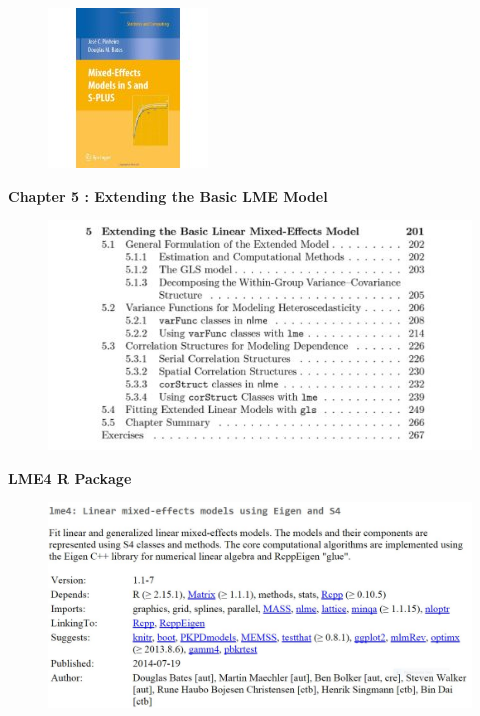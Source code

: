 \documentclass[compress]{beamer}        %
\begin{document}
				\begin{frame}
					\begin{figure}
						\centering
						\includegraphics[width=0.55\linewidth]{images/PinheiroBates}
						
					\end{figure}
				\end{frame}
				\begin{frame}
					\noindent \textbf{Chapter 5 :  Extending the Basic LME Model}
					\begin{figure}
						\centering
						\includegraphics[width=1.0\linewidth]{images/PBchap4}
					\end{figure}
					
				\end{frame}
\begin{frame}
\noindent \textbf{LME4 R Package}
\begin{figure}
\centering
\includegraphics[width=1.1\linewidth]{images/CRAN-lme4}
\end{figure}
\end{frame}
\end{document}
